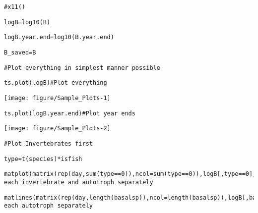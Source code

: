 \documentclass{article}\usepackage[]{graphicx}\usepackage[]{color}
\makeatletter
\def\maxwidth{ %
  \ifdim\Gin@nat@width>\linewidth
    \linewidth
  \else
    \Gin@nat@width
  \fi
}
\newenvironment{kframe}{%
 \def\at@end@of@kframe{}%
 \ifinner\ifhmode%
  \def\at@end@of@kframe{\end{minipage}}%
  \begin{minipage}{\columnwidth}%
 \fi\fi%
 \def\FrameCommand##1{\hskip\@totalleftmargin \hskip-\fboxsep
 \colorbox{shadecolor}{##1}\hskip-\fboxsep
     \hskip-\linewidth \hskip-\@totalleftmargin \hskip\columnwidth}%
 \MakeFramed {\advance\hsize-\width
   \@totalleftmargin\z@ \linewidth\hsize
   \@setminipage}}%
 {\par\unskip\endMakeFramed%
 \at@end@of@kframe}
\newenvironment{knitrout}{}{} %
\makeatother
\begin{document}
\begin{knitrout}
\begin{kframe}
\begin{lstlisting}[style=printcode]
#x11()\end{lstlisting}
\begin{lstlisting}[style=printcode]
logB=log10(B)\end{lstlisting}
\begin{lstlisting}[style=printcode]
logB.year.end=log10(B.year.end)\end{lstlisting}
\begin{lstlisting}[style=printcode]
B_saved=B\end{lstlisting}
\end{kframe}
\end{knitrout}
\begin{knitrout}
\color{fgcolor}\begin{kframe}
\begin{lstlisting}[style=printcode]
#Plot everything in simplest manner possible\end{lstlisting}
\begin{lstlisting}[style=printcode]
ts.plot(logB)#Plot everything\end{lstlisting}
\end{kframe}
\texttt{[image: figure/Sample\_Plots-1]} 
\begin{kframe}\begin{lstlisting}[style=printcode]
ts.plot(logB.year.end)#Plot year ends\end{lstlisting}
\end{kframe}
\texttt{[image: figure/Sample\_Plots-2]} 
\begin{kframe}\begin{lstlisting}[style=printcode]
#Plot Invertebrates first\end{lstlisting}
\begin{lstlisting}[style=printcode]
type=t(species)*isfish\end{lstlisting}


{\ttfamily\noindent\bfseries\color{errorcolor}{\#\# Error in t(species): object 'species' not found}}\begin{lstlisting}[style=printcode]
matplot(matrix(rep(day,sum(type==0)),ncol=sum(type==0)),logB[,type==0],type='l',col=1,lty=1)#Plot each invertebrate and autotroph separately\end{lstlisting}


{\ttfamily\noindent\bfseries\color{errorcolor}{\#\# Error in matrix(rep(day, sum(type == 0)), ncol = sum(type == 0)): object 'day' not found}}\begin{lstlisting}[style=printcode]
matlines(matrix(rep(day,length(basalsp)),ncol=length(basalsp)),logB[,basalsp],type='l',col=2,lty=1)#Plot each autotroph separately\end{lstlisting}



\end{kframe}
\end{knitrout}
\end{document}
